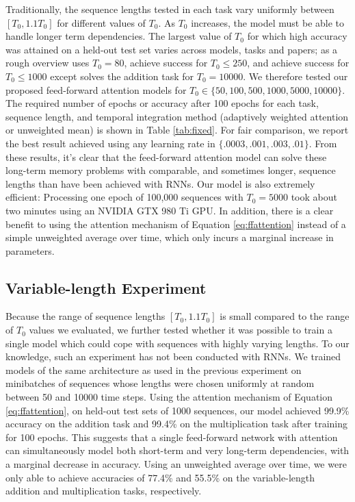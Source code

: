 \documentclass{article} %
\begin{document}
Traditionally, the sequence lengths tested in each task vary uniformly between $[T_0, 1.1T_0]$ for different values of $T_0$.
As $T_0$ increases, the model must be able to handle longer term dependencies.
The largest value of $T_0$ for which high accuracy was attained on a held-out test set varies across models, tasks and papers; as a rough overview \cite{sutskever2013importance} uses $T_0 = 80$, \cite{le2015simple,martens2011learning} achieve success for $T_0 \le 250$, and \cite{jaegar2012long,hochreiter1997long} achieve success for $T_0 \le 1000$ except \cite{jaegar2012long} solves the addition task for $T_0 = 10000$.
We therefore tested our proposed feed-forward attention models for $T_0 \in \{50, 100, 500, 1000, 5000, 10000\}$.
The required number of epochs or accuracy after 100 epochs for each task, sequence length, and temporal integration method (adaptively weighted attention or unweighted mean) is shown in Table \ref{tab:fixed}.
For fair comparison, we report the best result achieved using any learning rate in $\{.0003, .001, .003, .01\}$.
From these results, it's clear that the feed-forward attention model can solve these long-term memory problems with comparable, and sometimes longer, sequence lengths than have been achieved with RNNs.
Our model is also extremely efficient: Processing one epoch of 100,000 sequences with $T_0 = 5000$ took about two minutes using an NVIDIA GTX 980 Ti GPU.
In addition, there is a clear benefit to using the attention mechanism of Equation \ref{eq:ffattention} instead of a simple unweighted average over time, which only incurs a marginal increase in parameters.

\subsection{Variable-length Experiment}

Because the range of sequence lengths $[T_0, 1.1T_0]$ is small compared to the range of $T_0$ values we evaluated, we further tested whether it was possible to train a single model which could cope with sequences with highly varying lengths.
To our knowledge, such an experiment has not been conducted with RNNs.
We trained models of the same architecture as used in the previous experiment on minibatches of sequences whose lengths were chosen uniformly at random between 50 and 10000 time steps.
Using the attention mechanism of Equation \ref{eq:ffattention}, on held-out test sets of 1000 sequences, our model achieved 99.9\% accuracy on the addition task and 99.4\% on the multiplication task after training for 100 epochs.
This suggests that a single feed-forward network with attention can simultaneously model both short-term and very long-term dependencies, with a marginal decrease in accuracy.
Using an unweighted average over time, we were only able to achieve accuracies of 77.4\% and 55.5\% on the variable-length addition and multiplication tasks, respectively.
\end{document}
